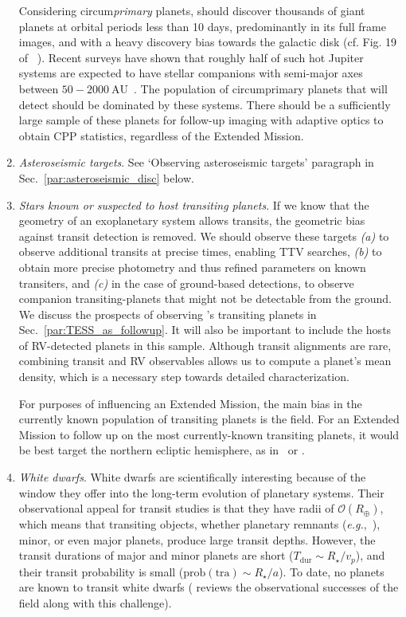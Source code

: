 \begin{enumerate}
	Considering circum\textit{primary} planets, \tess should discover thousands of giant planets at orbital periods less than 10 days, predominantly in its full frame images, and with a heavy discovery bias towards the galactic disk (cf. Fig. 19 of ~).
	Recent surveys have shown that roughly half of such hot Jupiter systems are expected to have stellar companions with semi-major axes between $50-2000\ \mathrm{AU}$~\citep{ngo_friends_2016}.
	The population of circumprimary planets that \tess will detect should be dominated by these systems.
	There should be a sufficiently large sample of these planets for follow-up imaging with adaptive optics to obtain CPP statistics, regardless of the Extended Mission.
	
	\item \textit{Asteroseismic targets}. See `Observing asteroseismic targets' paragraph in Sec.~\ref{par:asteroseismic_disc} below.
	
	
	\item \textit{Stars known or suspected to host transiting planets}. 
	If we know that the geometry of an exoplanetary system allows transits, the geometric bias against transit detection is removed.
	We should observe these targets \textit{(a)} to observe additional transits at precise times, enabling TTV searches, \textit{(b)} to obtain more precise photometry and thus refined parameters on known transiters, and \textit{(c)} in the case of ground-based detections, to observe companion transiting-planets that might not be detectable from the ground.
 	We discuss the prospects of \tess observing \kepler\!'s transiting planets in Sec.~\ref{par:TESS_as_followup}.
 	It will also be important to include the hosts of RV-detected planets in this sample. 
 	Although transit alignments are rare, combining transit and RV observables allows us to compute a planet's mean density, which is a necessary step towards detailed characterization. 
 	
 	For purposes of influencing an Extended Mission, the main bias in the currently known population of transiting planets is the \kepler field.
 	For an Extended Mission to follow up on the most currently-known transiting planets, it would be best target the northern ecliptic hemisphere, as in \npole\ or \nhemi.
	
	\item \textit{White dwarfs}.
	White dwarfs are scientifically interesting because of the window they offer into the long-term evolution of planetary systems.
	Their observational appeal for transit studies is that they have radii of $\mathcal{O}(R_\oplus)$, which means that transiting objects, whether planetary remnants (\textit{e.g.},~\citep{vanderburg_disintegrating_2015}), minor, or even major planets, produce large transit depths.
	However, the transit durations of major and minor planets are short ($T_\mathrm{dur} \sim R_\star / v_p$), and their transit probability is small ($\mathrm{prob}(\mathrm{tra}) \sim R_\star / a $).
	To date, no planets are known to transit white dwarfs (\citet{veras_postMS_2016} reviews the observational successes of the field along with this challenge).
	

\end{enumerate}
